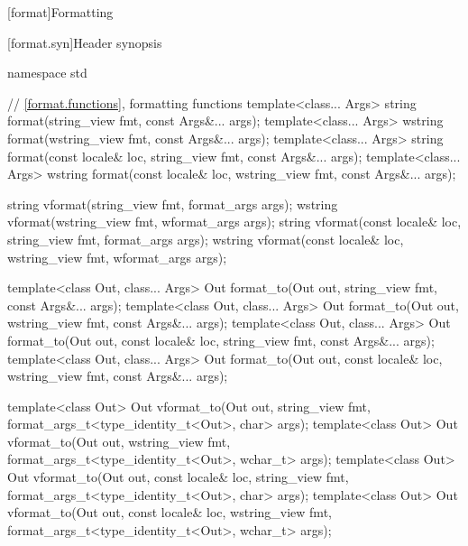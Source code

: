 
[format]{Formatting}

[format.syn]{Header  synopsis}

%
%
%
%
%
%
%
%
%
%
%
\begin{codeblock}
namespace std {
  // \ref{format.functions}, formatting functions
  template<class... Args>
    string format(string_view fmt, const Args&... args);
  template<class... Args>
    wstring format(wstring_view fmt, const Args&... args);
  template<class... Args>
    string format(const locale& loc, string_view fmt, const Args&... args);
  template<class... Args>
    wstring format(const locale& loc, wstring_view fmt, const Args&... args);

  string vformat(string_view fmt, format_args args);
  wstring vformat(wstring_view fmt, wformat_args args);
  string vformat(const locale& loc, string_view fmt, format_args args);
  wstring vformat(const locale& loc, wstring_view fmt, wformat_args args);

  template<class Out, class... Args>
    Out format_to(Out out, string_view fmt, const Args&... args);
  template<class Out, class... Args>
    Out format_to(Out out, wstring_view fmt, const Args&... args);
  template<class Out, class... Args>
    Out format_to(Out out, const locale& loc, string_view fmt, const Args&... args);
  template<class Out, class... Args>
    Out format_to(Out out, const locale& loc, wstring_view fmt, const Args&... args);

  template<class Out>
    Out vformat_to(Out out, string_view fmt,
                   format_args_t<type_identity_t<Out>, char> args);
  template<class Out>
    Out vformat_to(Out out, wstring_view fmt,
                   format_args_t<type_identity_t<Out>, wchar_t> args);
  template<class Out>
    Out vformat_to(Out out, const locale& loc, string_view fmt,
                   format_args_t<type_identity_t<Out>, char> args);
  template<class Out>
    Out vformat_to(Out out, const locale& loc, wstring_view fmt,
                   format_args_t<type_identity_t<Out>, wchar_t> args);

}
\end{codeblock}
